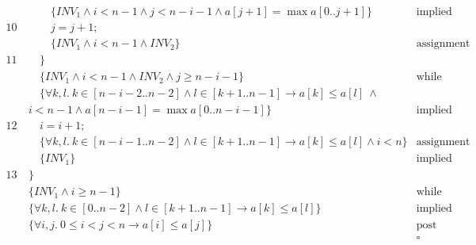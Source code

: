 \documentclass{article}
\begin{document}
\begin{align*}
& \quad \quad \{ INV_1 \land i < n-1 \land j < n-i-1 \land a[j+1] = \max a[0..j+1] \}  & \text{implied} \\
10 \ & \quad \quad j = j + 1; \\
& \quad \quad \{ INV_1 \land i < n-1 \land INV_2 \}  & \text{assignment} \\
11 \ & \quad \} \\
& \quad \{ INV_1 \land i < n-1 \land INV_2 \land j \geq n-i-1 \}  & \text{while} \\
& \quad \{ \forall k, l. \ k \in [n-i-2..n-2] \land l \in [k+1..n-1] \to a[k] \leq a[l] \ \land \\
& i < n-1 \land a[n-i-1] = \max a[0..n-i-1] \}  & \text{implied} \\
12 \ & \quad i = i + 1; \\
& \quad \{ \forall k, l. \ k \in [n-i-1..n-2] \land l \in [k+1..n-1] \to a[k] \leq a[l] \land i < n \}  & \text{assignment} \\
& \quad \{ INV_1 \}  & \text{implied} \\
13 \ & \} \\
& \{ INV_1 \land i \geq n-1 \}  & \text{while} \\
& \{ \forall k, l. \ k \in [0..n-2] \land l \in [k+1..n-1] \to a[k] \leq a[l] \} & \text{implied} \\
& \{ \forall i, j. \ 0 \leq i < j < n \to a[i] \leq a[j] \}  & \text{post} \\
& & \square
\end{align*}
\end{document}
